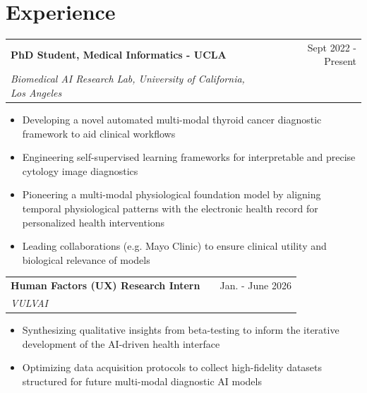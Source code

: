 \documentclass[a4paper,12pt]{article}
\makeatletter
\newenvironment{joblong}[3]
    {
    \begin{tabularx}{\linewidth}{@{}l X r@{}}
    \textbf{#1} & \hfill &  #2 \\
    \textit{#3} & & \\[3.75pt]  
    \end{tabularx}
    \begin{minipage}[t]{\linewidth}
    \begin{itemize}[nosep,after=\strut, leftmargin=1em, itemsep=2.5pt,label=\scriptsize$\bullet$]
    }
    {
    \end{itemize}
    \end{minipage}    
    }
\makeatother
\begin{document}


\section{Experience}

\begin{joblong}{PhD Student, Medical Informatics - UCLA}{Sept 2022 - Present}{Biomedical AI Research Lab, University of California, Los Angeles}
\item Developing a novel automated multi-modal thyroid cancer diagnostic framework to aid clinical workflows
\item Engineering self-supervised learning frameworks for interpretable and precise cytology image diagnostics 
\item Pioneering a multi-modal physiological foundation model by aligning temporal physiological patterns with the electronic health record for personalized health interventions
\item Leading collaborations (e.g. Mayo Clinic) to ensure clinical utility and biological relevance of models
\end{joblong}

\begin{joblong}{Human Factors (UX) Research Intern}{Jan. - June 2026}{VULVAI}
\item Synthesizing qualitative insights from beta-testing to inform the iterative development of the AI-driven health interface
\item Optimizing data acquisition protocols to collect high-fidelity datasets structured for future multi-modal diagnostic AI models
\end{joblong}
\end{document}
